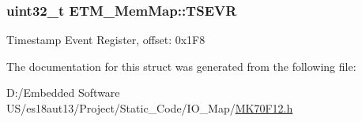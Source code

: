 \subsubsection[{T\+S\+E\+V\+R}]{\setlength{\rightskip}{0pt plus 5cm}uint32\+\_\+t E\+T\+M\+\_\+\+Mem\+Map\+::\+T\+S\+E\+V\+R}\label{struct_e_t_m___mem_map_ad30bdaff018bc7d3b586ce0ca41dfd9b}
Timestamp Event Register, offset\+: 0x1\+F8 

The documentation for this struct was generated from the following file\+:\begin{DoxyCompactItemize}
\item 
D\+:/\+Embedded Software U\+S/es18aut13/\+Project/\+Static\+\_\+\+Code/\+I\+O\+\_\+\+Map/\hyperlink{_m_k70_f12_8h}{M\+K70\+F12.\+h}\end{DoxyCompactItemize}
